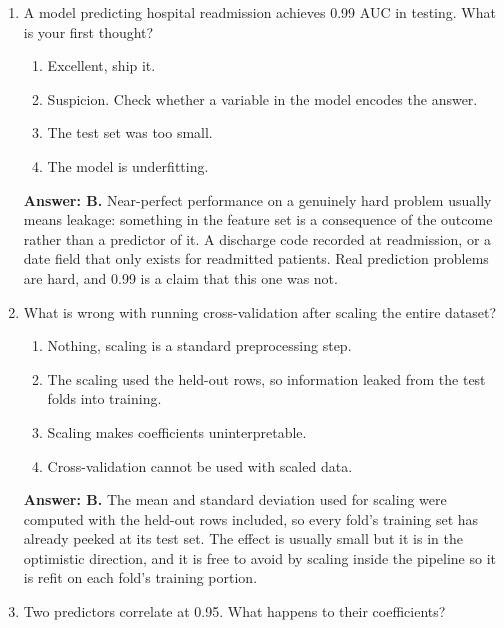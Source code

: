 \documentclass[11pt]{article}
\begin{document}
\begin{enumerate}[itemsep=14pt]
\item A model predicting hospital readmission achieves 0.99 AUC in testing. What is your first thought?

\begin{enumerate}[label=\Alph*., itemsep=1pt, topsep=3pt]
  \item Excellent, ship it.
  \item Suspicion. Check whether a variable in the model encodes the answer.
  \item The test set was too small.
  \item The model is underfitting.
\end{enumerate}

\vspace{2pt}
\textbf{Answer: B.} Near-perfect performance on a genuinely hard problem usually means leakage: something in the feature set is a consequence of the outcome rather than a predictor of it. A discharge code recorded at readmission, or a date field that only exists for readmitted patients. Real prediction problems are hard, and 0.99 is a claim that this one was not.
\vspace{4pt}

\item What is wrong with running cross-validation after scaling the entire dataset?

\begin{enumerate}[label=\Alph*., itemsep=1pt, topsep=3pt]
  \item Nothing, scaling is a standard preprocessing step.
  \item The scaling used the held-out rows, so information leaked from the test folds into training.
  \item Scaling makes coefficients uninterpretable.
  \item Cross-validation cannot be used with scaled data.
\end{enumerate}

\vspace{2pt}
\textbf{Answer: B.} The mean and standard deviation used for scaling were computed with the held-out rows included, so every fold's training set has already peeked at its test set. The effect is usually small but it is in the optimistic direction, and it is free to avoid by scaling inside the pipeline so it is refit on each fold's training portion.
\vspace{4pt}

\item Two predictors correlate at 0.95. What happens to their coefficients?


\end{enumerate}
\end{document}
